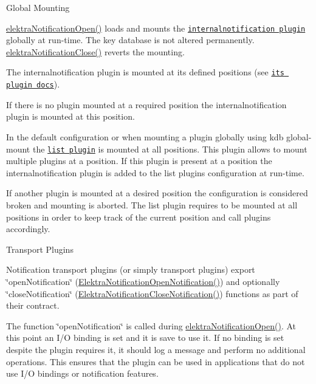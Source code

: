 \begin{DoxyParagraph}{Global Mounting}

\end{DoxyParagraph}
\hyperlink{group__kdbnotification_gaeae96154abdb5fdbf1b34a01e2b23e44}{elektra\+Notification\+Open()} loads and mounts the \href{https://www.libelektra.org/plugins/internalnotification}{\tt internalnotification plugin} globally at run-\/time. The key database is not altered permanently. \hyperlink{group__kdbnotification_ga5685dafbd4131011365628d6d9213594}{elektra\+Notification\+Close()} reverts the mounting.

The internalnotification plugin is mounted at its defined positions (see \href{https://www.libelektra.org/plugins/internalnotification}{\tt its plugin docs}).


\begin{DoxyItemize}
\item If there is no plugin mounted at a required position the internalnotification plugin is mounted at this position.
\item In the default configuration or when mounting a plugin globally using {\ttfamily kdb global-\/mount} the \href{https://www.libelektra.org/plugins/list}{\tt list plugin} is mounted at all positions. This plugin allows to mount multiple plugins at a position. If this plugin is present at a position the internalnotification plugin is added to the list plugin\textquotesingle{}s configuration at run-\/time.
\item If another plugin is mounted at a desired position the configuration is considered broken and mounting is aborted. The list plugin requires to be mounted at all positions in order to keep track of the current position and call plugins accordingly.
\end{DoxyItemize}

\begin{DoxyParagraph}{Transport Plugins}

\end{DoxyParagraph}
Notification transport plugins (or simply transport plugins) export \char`\"{}open\+Notification\char`\"{} (\hyperlink{kdbnotificationinternal_8h_adf7cf73a2740a3852b73d607b911a254}{Elektra\+Notification\+Open\+Notification()}) and optionally \char`\"{}close\+Notification\char`\"{} (\hyperlink{kdbnotificationinternal_8h_adc260d2c576df585aaa965cf97bc9284}{Elektra\+Notification\+Close\+Notification()}) functions as part of their contract.

The function \char`\"{}open\+Notification\char`\"{} is called during \hyperlink{group__kdbnotification_gaeae96154abdb5fdbf1b34a01e2b23e44}{elektra\+Notification\+Open()}. At this point an I/O binding is set and it is save to use it. If no binding is set despite the plugin requires it, it should log a message and perform no additional operations. This ensures that the plugin can be used in applications that do not use I/O bindings or notification features.

